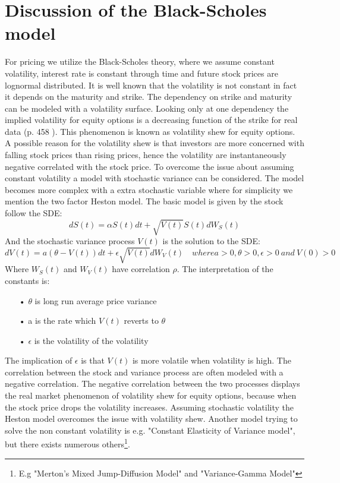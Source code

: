 \section{Discussion of the Black-Scholes model}
For pricing we utilize the Black-Scholes theory, where we assume constant volatility, interest rate is constant through time and future stock prices are lognormal distributed. It is well known that the volatility is not constant in fact it depends on the maturity and strike. The dependency on strike and maturity can be modeled with a volatility surface. Looking only at one dependency the implied volatility for equity options is a decreasing function of the strike for real data (p. 458 \parencite{Hull}). This phenomenon is known as volatility shew for equity options. \\

A possible reason for the volatility shew is that investors are more concerned with falling stock prices than rising prices, hence the volatility are instantaneously negative correlated with the stock price. To overcome the issue about assuming constant volatility a model with stochastic variance can be considered. The model becomes more complex with a extra stochastic variable where for simplicity we mention the two factor Heston model. The basic model is given by the stock follow the SDE:
$$dS(t)=\alpha S(t) dt + \sqrt{V(t)} S(t) dW_S(t)$$
And the stochastic variance process $V(t)$ is the solution to the SDE:
$$dV(t)=a(\theta - V(t))dt + \epsilon \sqrt{V(t)} dW_V(t) \quad where a>0,\theta>0, \epsilon>0 \ and \ V(0)>0$$
Where $W_S(t)$ and $W_V(t)$ have correlation $\rho$. The interpretation of the constants is:
\begin{enumerate}
\item[•] $\theta$ is long run average price variance
\item[•] a is the rate which $V(t)$ reverts to $\theta$
\item[•] $\epsilon$ is the volatility of the volatility
\end{enumerate} 
The implication of $\epsilon$ is that $V(t)$ is more volatile when volatility is high. The correlation between the stock and variance process are often modeled with a negative correlation. The negative correlation between the two processes displays the real market phenomenon of volatility shew for equity options, because when the stock price drops the volatility increases. Assuming stochastic volatility the Heston model overcomes the issue with volatility shew. Another model trying to solve the non constant volatility is e.g. "Constant Elasticity of Variance model", but there exists numerous others\footnote{E.g "Merton's Mixed Jump-Diffusion Model" and "Variance-Gamma Model"}. \\

